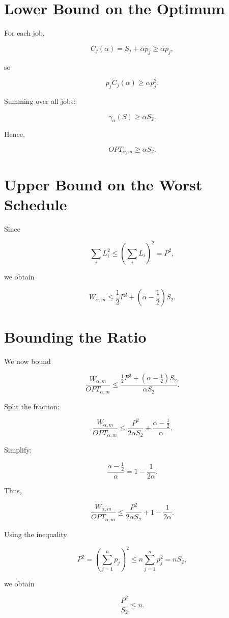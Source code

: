 \documentclass[11pt]{article}
\begin{document}
\section*{Lower Bound on the Optimum}

For each job,

\[
C_j(\alpha) = S_j + \alpha p_j \ge \alpha p_j,
\]

so

\[
p_j C_j(\alpha) \ge \alpha p_j^2.
\]

Summing over all jobs:

\[
\gamma_{\alpha}(S) \ge \alpha S_2.
\]

Hence,

\[
OPT_{\alpha,m} \ge \alpha S_2.
\]

\section*{Upper Bound on the Worst Schedule}

Since

\[
\sum_i L_i^2 \le \left(\sum_i L_i\right)^2 = P^2,
\]

we obtain

\[
W_{\alpha,m}
\le
\frac{1}{2} P^2 + \left(\alpha - \frac{1}{2}\right) S_2.
\]

\section*{Bounding the Ratio}

We now bound

\[
\frac{W_{\alpha,m}}{OPT_{\alpha,m}}
\le
\frac{\frac{1}{2} P^2 + \left(\alpha - \frac{1}{2}\right) S_2}{\alpha S_2}.
\]

Split the fraction:

\[
\frac{W_{\alpha,m}}{OPT_{\alpha,m}}
\le
\frac{P^2}{2 \alpha S_2}
+
\frac{\alpha - \frac{1}{2}}{\alpha}.
\]

Simplify:

\[
\frac{\alpha - \frac{1}{2}}{\alpha}
= 1 - \frac{1}{2\alpha}.
\]

Thus,

\[
\frac{W_{\alpha,m}}{OPT_{\alpha,m}}
\le
\frac{P^2}{2 \alpha S_2}
+
1 - \frac{1}{2\alpha}.
\]

Using the inequality

\[
P^2 = \left(\sum_{j=1}^n p_j\right)^2 \le n \sum_{j=1}^n p_j^2 = n S_2,
\]

we obtain

\[
\frac{P^2}{S_2} \le n.
\]
\end{document}
